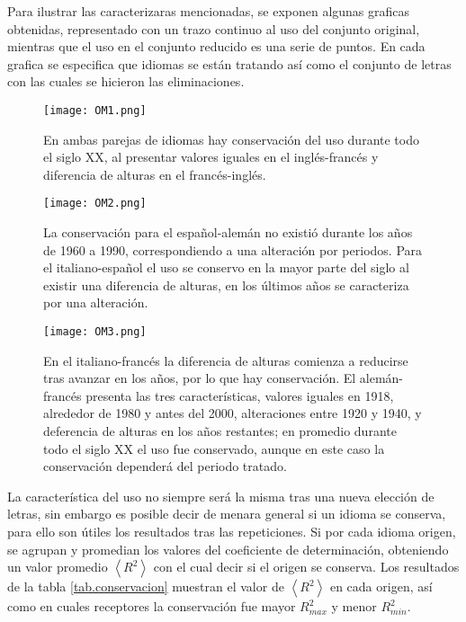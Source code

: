 Para ilustrar las caracterizaras mencionadas, se exponen algunas graficas obtenidas, representado con un trazo continuo al uso del conjunto original, mientras que el uso en el conjunto reducido  es una serie de puntos. En cada grafica se especifica que idiomas se están tratando así como el conjunto de letras con las cuales se hicieron las eliminaciones. 

\clearpage

\begin{figure}[h!]
	\centering
	\texttt{[image: OM1.png]}
	\label{fig.OM1}
	\caption{En ambas parejas de idiomas hay conservación del uso durante todo el siglo XX, al presentar valores iguales en el inglés-francés y  diferencia de alturas en el francés-inglés.}
\end{figure}


\begin{figure}[h!]
	\centering
	\texttt{[image: OM2.png]}
	\label{fig.OM2}
	\caption{La conservación para el español-alemán no existió durante los años de 1960 a 1990,  correspondiendo a una alteración por periodos. Para el italiano-español el uso se conservo  en la mayor parte del siglo al existir una diferencia de alturas, en los últimos años se caracteriza por una alteración.}
\end{figure}

\clearpage
\begin{figure}[h!]
	\centering
	\texttt{[image: OM3.png]}
	\label{fig.OM3}
	\caption{ En el italiano-francés la diferencia de alturas comienza a reducirse tras avanzar en los años, por lo que hay conservación. El alemán-francés  presenta las tres características,  valores iguales  en 1918, alrededor de 1980 y antes del 2000,  alteraciones entre 1920 y 1940, y deferencia de alturas  en los años restantes; en promedio durante todo el siglo XX el uso fue conservado, aunque en este caso la conservación dependerá del periodo tratado.}
\end{figure}




La característica del uso no siempre será la misma tras una nueva elección de letras, sin embargo es posible decir de menara general si un idioma se conserva, para ello son útiles los resultados tras las repeticiones. Si por cada idioma origen, se agrupan y promedian los valores del coeficiente de determinación, obteniendo un valor promedio $\left \langle R^{2}  \right \rangle$ con el cual decir si el origen se conserva.  Los resultados de la tabla \ref{tab.conservacion} muestran el valor de  $\left \langle R^{2} \right \rangle$ en cada origen,  así como  en cuales receptores la conservación fue mayor $R^{2}_{max}$ y  menor $R^{2}_{min}$.





